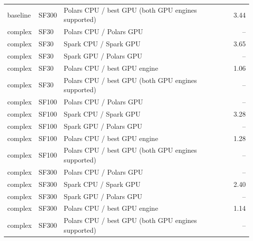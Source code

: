 \begin{tabular}{lllr}
baseline & SF300 & Polars CPU / best GPU (both GPU engines supported) & 3.44 \\
complex & SF30 & Polars CPU / Polars GPU & -- \\
complex & SF30 & Spark CPU / Spark GPU & 3.65 \\
complex & SF30 & Spark GPU / Polars GPU & -- \\
complex & SF30 & Polars CPU / best GPU engine & 1.06 \\
complex & SF30 & Polars CPU / best GPU (both GPU engines supported) & -- \\
complex & SF100 & Polars CPU / Polars GPU & -- \\
complex & SF100 & Spark CPU / Spark GPU & 3.28 \\
complex & SF100 & Spark GPU / Polars GPU & -- \\
complex & SF100 & Polars CPU / best GPU engine & 1.28 \\
complex & SF100 & Polars CPU / best GPU (both GPU engines supported) & -- \\
complex & SF300 & Polars CPU / Polars GPU & -- \\
complex & SF300 & Spark CPU / Spark GPU & 2.40 \\
complex & SF300 & Spark GPU / Polars GPU & -- \\
complex & SF300 & Polars CPU / best GPU engine & 1.14 \\
complex & SF300 & Polars CPU / best GPU (both GPU engines supported) & -- \\
\bottomrule
\end{tabular}
